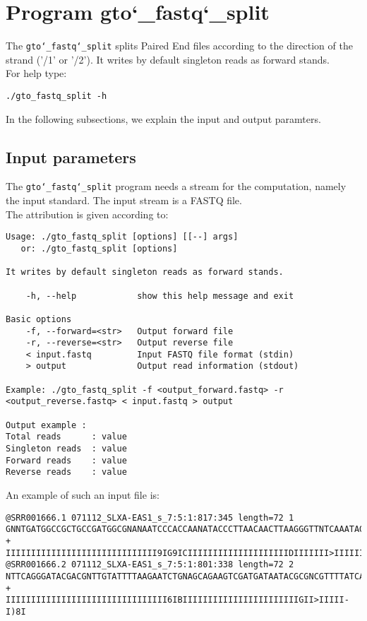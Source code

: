 \section{Program gto\char`_fastq\char`_split}
The \texttt{gto\char`_fastq\char`_split} splits Paired End files according to the direction of the strand ('/1' or '/2'). It writes by default singleton reads as forward stands. \\
For help type:
\begin{lstlisting}
./gto_fastq_split -h
\end{lstlisting}
In the following subsections, we explain the input and output paramters.

\subsection*{Input parameters}

The \texttt{gto\char`_fastq\char`_split} program needs a stream for the computation, namely the input standard. The input stream is a FASTQ file.\\
The attribution is given according to:
\begin{lstlisting}
Usage: ./gto_fastq_split [options] [[--] args]
   or: ./gto_fastq_split [options]

It writes by default singleton reads as forward stands.

    -h, --help            show this help message and exit

Basic options
    -f, --forward=<str>   Output forward file
    -r, --reverse=<str>   Output reverse file
    < input.fastq         Input FASTQ file format (stdin)
    > output         	  Output read information (stdout)

Example: ./gto_fastq_split -f <output_forward.fastq> -r <output_reverse.fastq> < input.fastq > output

Output example :
Total reads      : value
Singleton reads  : value
Forward reads    : value
Reverse reads    : value
\end{lstlisting}
An example of such an input file is:
\begin{lstlisting}
@SRR001666.1 071112_SLXA-EAS1_s_7:5:1:817:345 length=72 1
GNNTGATGGCCGCTGCCGATGGCGNANAATCCCACCAANATACCCTTAACAACTTAAGGGTTNTCAAATAGA
+
IIIIIIIIIIIIIIIIIIIIIIIIIIIIII9IG9ICIIIIIIIIIIIIIIIIIIIIDIIIIIII>IIIIII/
@SRR001666.2 071112_SLXA-EAS1_s_7:5:1:801:338 length=72 2
NTTCAGGGATACGACGNTTGTATTTTAAGAATCTGNAGCAGAAGTCGATGATAATACGCGNCGTTTTATCAN
+
IIIIIIIIIIIIIIIIIIIIIIIIIIIIIIII6IBIIIIIIIIIIIIIIIIIIIIIIIGII>IIIII-I)8I
\end{lstlisting}

